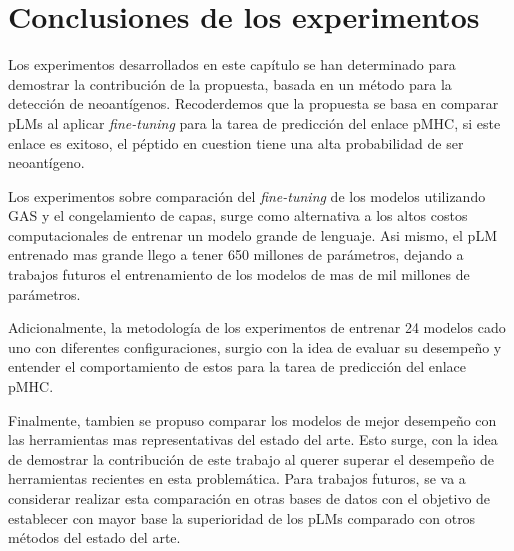 \section{Conclusiones de los experimentos}

Los experimentos desarrollados en este capítulo se han determinado para demostrar la contribución de la propuesta, basada en un método para la detección de neoantígenos. Recoderdemos que la propuesta se basa en comparar pLMs al aplicar \textit{fine-tuning} para la tarea de predicción del enlace pMHC, si este enlace es exitoso, el péptido en cuestion tiene una alta probabilidad de ser neoantígeno. 

Los experimentos sobre comparación del \textit{fine-tuning} de los modelos utilizando GAS y el congelamiento de capas, surge como alternativa a los altos costos computacionales de entrenar un modelo grande de lenguaje. Asi mismo, el pLM entrenado mas grande llego a tener 650 millones de parámetros, dejando a trabajos futuros el entrenamiento de los modelos de mas de mil millones de parámetros.

Adicionalmente, la metodología de los experimentos de entrenar 24 modelos cado uno con diferentes configuraciones, surgio con la idea de evaluar su desempeño y entender el comportamiento de estos para la tarea de predicción del enlace pMHC. 

Finalmente, tambien se propuso comparar los modelos de mejor desempeño con las herramientas mas representativas del estado del arte. Esto surge, con la idea de demostrar la contribución de este trabajo al querer superar el desempeño de herramientas recientes en esta problemática. Para trabajos futuros, se va a considerar realizar esta comparación en otras bases de datos con el objetivo de establecer con mayor base la superioridad de los pLMs comparado con otros métodos del estado del arte.
